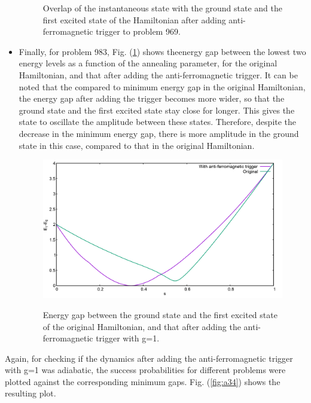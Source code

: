 \documentclass[../main.tex]{subfiles}
\begin{document}
\begin{itemize}
\begin{figure}[H]
\caption{Overlap of the instantaneous state with the ground state and the first excited state of the Hamiltonian after adding anti-ferromagnetic trigger to problem 969.}
\end{figure}
\item  Finally, for problem 983, Fig. (\ref{fig:a51}) shows theenergy gap between the lowest two energy levels as a function of the annealing parameter, for the original Hamiltonian, and that after adding the anti-ferromagnetic trigger. It can be noted that the compared to minimum energy gap in the original Hamiltonian, the energy gap after adding the trigger becomes more wider, so that the ground state and the first excited state stay close for longer. This gives the state to oscillate the amplitude between these states. Therefore, despite the decrease in the minimum energy gap, there is more amplitude in the ground state in this case, compared to that in the original Hamiltonian.

\begin{figure}[H]
  \centering
  \includegraphics[scale=0.24]{983_Mingap.png}
  \label{fig:a51}

\caption{Energy gap between the ground state and the first excited state of the original Hamiltonian, and that after adding the anti-ferromagnetic trigger with g=1.}
\end{figure}
\end{itemize}


Again, for checking if the dynamics after adding the anti-ferromagnetic trigger with g=1 was adiabatic, the success probabilities for different problems were plotted against the corresponding minimum gaps. Fig. (\ref{fig:a34}) shows the resulting plot.
\end{document}
